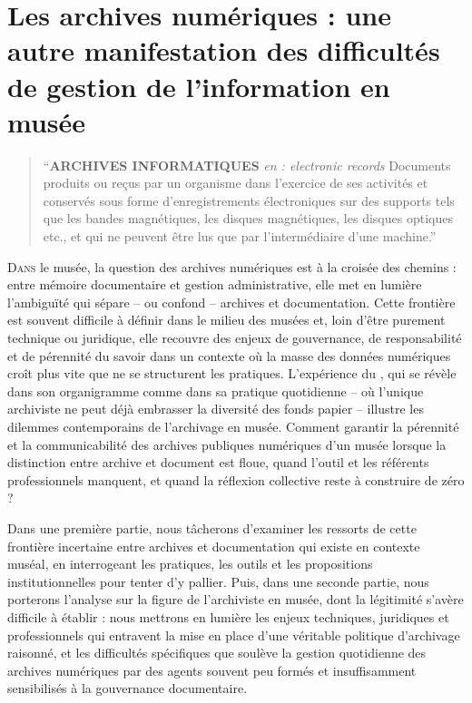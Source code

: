 \chapter[Les archives numériques]{\label{II-C}Les archives numériques : une autre manifestation des difficultés de gestion de l’information en musée }

\begin{quote}
	\enquote{\textbf{ARCHIVES INFORMATIQUES} \textit{en : electronic records}
		Documents produits ou reçus par un organisme dans l'exercice de
		ses activités et conservés sous forme d'enregistrements
		électroniques sur des supports tels que les bandes magnétiques,
		les disques magnétiques, les disques optiques etc., et qui ne
		peuvent être lus que par l’intermédiaire d’une machine.}
\end{quote}

\lettrine{D}{ans} le musée, la question des archives numériques est à la croisée des chemins : entre mémoire documentaire et gestion administrative, elle met en lumière l’ambiguïté qui sépare – ou confond – archives et documentation. Cette frontière est souvent difficile à définir dans le milieu des musées et, loin d’être purement technique ou juridique, elle recouvre des enjeux de gouvernance, de responsabilité et de pérennité du savoir dans un contexte où la masse des données numériques croît plus vite que ne se structurent les pratiques. L’expérience du \mae, qui se révèle dans son organigramme comme dans sa pratique quotidienne – où l’unique archiviste ne peut déjà embrasser la diversité des fonds papier – illustre les dilemmes contemporains de l’archivage en musée. Comment garantir la pérennité et la communicabilité des archives publiques numériques d'un musée lorsque la distinction entre archive et document est floue, quand l’outil et les référents professionnels manquent, et quand la réflexion collective reste à construire de zéro ? 

Dans une première partie, nous tâcherons d'examiner les ressorts de cette frontière incertaine entre archives et documentation qui existe en contexte muséal, en interrogeant les pratiques, les outils et les propositions institutionnelles pour tenter d'y pallier. Puis, dans une seconde partie, nous porterons l’analyse sur la figure de l’archiviste en musée, dont la légitimité s’avère difficile à établir : nous mettrons en lumière les enjeux techniques, juridiques et professionnels qui entravent la mise en place d’une véritable politique d’archivage raisonné, et les difficultés spécifiques que soulève la gestion quotidienne des archives numériques par des agents souvent peu formés et insuffisamment sensibilisés à la gouvernance documentaire.

